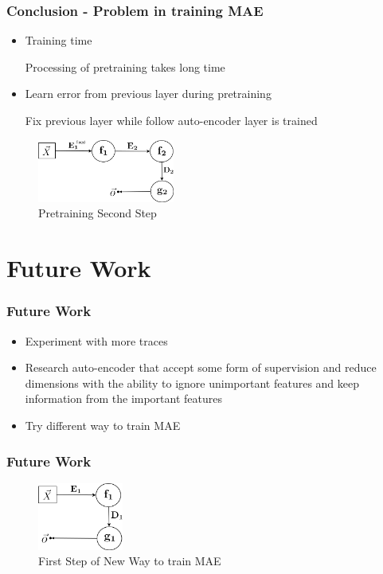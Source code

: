 \documentclass{beamer}
\begin{document}
\begin{frame}
\frametitle{Conclusion - Problem in training MAE}
\begin{itemize}
\item Training time

Processing of pretraining takes long time

\item Learn error from previous layer during pretraining

Fix previous layer while follow auto-encoder layer is trained

\end{itemize}

\begin{figure}[t!]
    \centering
    \includegraphics[width=0.4\textwidth]{../paper/pictures/figures/train_MAE2.png}
    \caption{Pretraining Second Step}
    \label{fig:train_MAE2}
\end{figure}
\end{frame}

\section{Future Work}
\begin{frame}
\frametitle{Future Work}
\begin{itemize}
\item Experiment with more traces
\item Research auto-encoder that accept some form of supervision and reduce dimensions with the ability to ignore unimportant features and keep information from the important features
\item Try different way to train MAE
\end{itemize}
\end{frame}

\begin{frame}
\frametitle{Future Work}
\begin{figure}[t!]
    \centering
    \includegraphics[width=0.25\textwidth]{../paper/pictures/figures/train_new_MAE1.png}
    \caption{First Step of New Way to train MAE}
    \label{fig:train_NMAE1}
\end{figure}
\end{frame}
\end{document}
